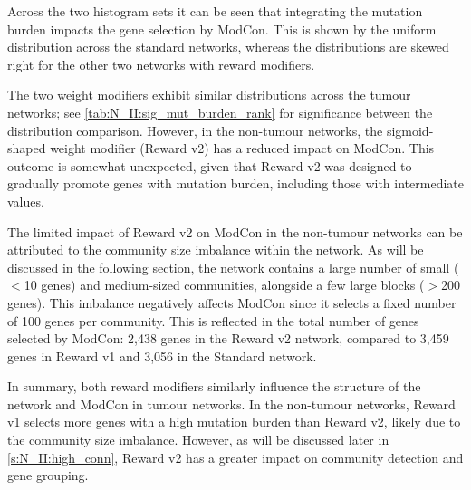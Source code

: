Across the two histogram sets it can be seen that integrating the mutation burden impacts the gene selection by ModCon. This is shown by the uniform distribution across the standard networks, whereas the distributions are skewed right for the other two networks with reward modifiers.

The two weight modifiers exhibit similar distributions across the tumour networks; see \cref{tab:N_II:sig_mut_burden_rank} for significance between the distribution comparison. However, in the non-tumour networks, the sigmoid-shaped weight modifier (Reward v2) has a reduced impact on ModCon. This outcome is somewhat unexpected, given that Reward v2 was designed to gradually promote genes with mutation burden, including those with intermediate values.

The limited impact of Reward v2 on ModCon in the non-tumour networks can be attributed to the community size imbalance within the network. As will be discussed in the following section, the network contains a large number of small ($<$10 genes) and medium-sized communities, alongside a few large blocks ($>$200 genes). This imbalance negatively affects ModCon since it selects a fixed number of 100 genes per community. This is reflected in the total number of genes selected by ModCon: 2,438 genes in the Reward v2 network, compared to 3,459 genes in Reward v1 and 3,056 in the Standard network.

In summary, both reward modifiers similarly influence the structure of the network and ModCon in tumour networks. In the non-tumour networks, Reward v1 selects more genes with a high mutation burden than Reward v2, likely due to the community size imbalance. However, as will be discussed later in \cref{s:N_II:high_conn}, Reward v2 has a greater impact on community detection and gene grouping.



